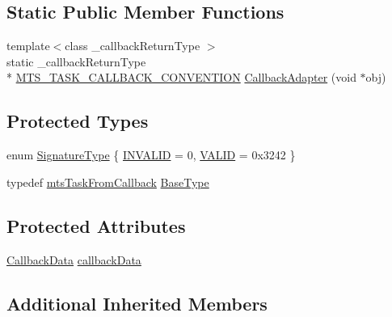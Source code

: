 \subsection*{Static Public Member Functions}
\begin{DoxyCompactItemize}
\item 
{\footnotesize template$<$class \-\_\-callback\-Return\-Type $>$ }\\static \-\_\-callback\-Return\-Type \\*
\hyperlink{mts_task_from_callback_8h_a7501f94bb1b37dc8d295bd2f2c800084}{M\-T\-S\-\_\-\-T\-A\-S\-K\-\_\-\-C\-A\-L\-L\-B\-A\-C\-K\-\_\-\-C\-O\-N\-V\-E\-N\-T\-I\-O\-N} \hyperlink{classmts_task_from_callback_adapter_aabe621b924092e85d4729bda7cbfce06}{Callback\-Adapter} (void $\ast$obj)
\end{DoxyCompactItemize}
\subsection*{Protected Types}
\begin{DoxyCompactItemize}
\item 
enum \hyperlink{classmts_task_from_callback_adapter_aa81f29d07e560c1b9f5a9f004e49df97}{Signature\-Type} \{ \hyperlink{classmts_task_from_callback_adapter_aa81f29d07e560c1b9f5a9f004e49df97a7c9a9db9f50a953eb0a559f305bf6f80}{I\-N\-V\-A\-L\-I\-D} = 0, 
\hyperlink{classmts_task_from_callback_adapter_aa81f29d07e560c1b9f5a9f004e49df97aed556e2efeed6c0fb3d38d53fefb5d08}{V\-A\-L\-I\-D} = 0x3242
 \}
\item 
typedef \hyperlink{classmts_task_from_callback}{mts\-Task\-From\-Callback} \hyperlink{classmts_task_from_callback_adapter_a1f50853b13e0014ad9c64ac6b11f3216}{Base\-Type}
\end{DoxyCompactItemize}
\subsection*{Protected Attributes}
\begin{DoxyCompactItemize}
\item 
\hyperlink{structmts_task_from_callback_adapter_1_1_callback_data}{Callback\-Data} \hyperlink{classmts_task_from_callback_adapter_aa7f1cc998e5366d8c3eebc802f9d7652}{callback\-Data}
\end{DoxyCompactItemize}
\subsection*{Additional Inherited Members}


